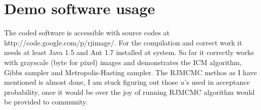 \documentclass[journal]{IEEEtran}
\begin{document}
\section{Demo software usage}
The coded software is accessible with source codes at http://code.google.com/p/rjimage/. For the compilation and correct work it needs at least Java 1.5 and Ant 1.7 installed at system. So far it correctly works with grayscale (byte for pixel) images and demonstrates the ICM algorithm, Gibbs sampler and Metropolis-Hasting sampler. The RJMCMC methos as I have mentioned is almost done, I am stuck figuring out those $u$'s used in acceptance probability, once it would be over the joy of running RJMCMC algorithm would be provided to community.




\end{document}
